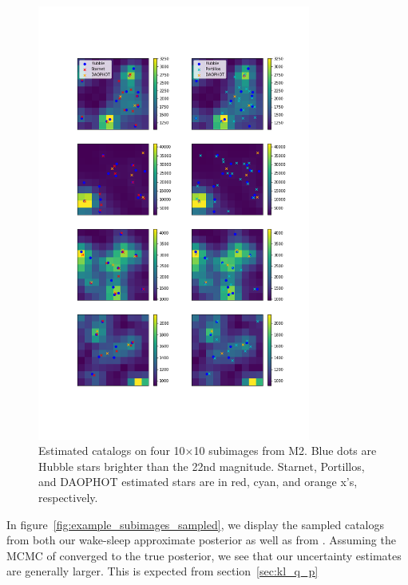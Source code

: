 \begin{figure}[h]
    \centering
    \vspace{-3cm}
    \includegraphics[width=0.8\textwidth]{figures/example_subimages.png}
    \vspace{-3cm}
    \caption{Estimated catalogs on four 10$\times$10 subimages from
    M2. Blue dots are Hubble stars brighter than the 22nd magnitude.
    Starnet, Portillos, and DAOPHOT estimated stars are in
    red, cyan, and orange x's, respectively. }
    \label{fig:example_subimages}
\end{figure}


In figure~\ref{fig:example_subimages_sampled}, we display the sampled catalogs from both our wake-sleep approximate posterior as well as from \cite{Feder_2019}. Assuming the MCMC
of \cite{Feder_2019} converged to the true posterior, we see that our uncertainty estimates
are generally larger. This is expected from section~\ref{sec:kl_q_p}

